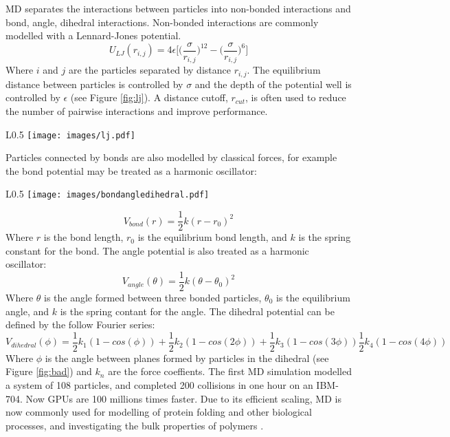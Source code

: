 MD separates the interactions between particles into non-bonded interactions and bond, angle, dihedral interactions.
Non-bonded interactions are commonly modelled with a Lennard-Jones potential.
$$ U_{LJ}(r_{i,j}) = 4\epsilon\big[\big(\frac{\sigma}{r_{i,j}}\big)^{12}-\big(\frac{\sigma}{r_{i,j}}\big)^{6}\big]$$
Where $i$ and $j$ are the particles separated by distance $r_{i,j}$.
The equilibrium distance between particles is controlled by $\sigma$ and the depth of the potential well is controlled by $\epsilon$ (see Figure \ref{fig:lj}).
A distance cutoff, $r_{cut}$, is often used to reduce the number of pairwise interactions and improve performance.

\begin{wrapfigure}{L}{0.5\linewidth}
    \centering
    \texttt{[image: images/lj.pdf]}
    \caption{The Lennard-Jones potential with relevant distances labelled}
    \label{fig:lj}
\end{wrapfigure}

Particles connected by bonds are also modelled by classical forces, for example the bond potential may be treated as a harmonic oscillator:

\begin{wrapfigure}{L}{0.5\linewidth}
    \centering
    \texttt{[image: images/bondangledihedral.pdf]}
    \caption{Bonded interactions: bond (top left), angle (top right), and dihedral (bottom). Image adapted from \cite{punma}.}
    \label{fig:bad}
\end{wrapfigure}

$$V_{bond}(r) = \frac{1}{2}k(r-r_{0})^{2}$$
Where $r$ is the bond length, $r_{0}$ is the equilibrium bond length, and $k$ is the spring constant for the bond.
The angle potential is also treated as a harmonic oscillator:
$$V_{angle}(\theta)=\frac{1}{2}k(\theta-\theta_{0})^{2}$$
Where $\theta$ is the angle formed between three bonded particles, $\theta_{0}$ is the equilibrium angle, and $k$ is the spring contant for the angle.
The dihedral potential can be defined by the follow Fourier series:
$$V_{dihedral}(\phi)=\frac{1}{2}k_{1}(1-cos(\phi))+\frac{1}{2}k_{2}(1-cos(2\phi))+\frac{1}{2}k_{3}(1-cos(3\phi))\frac{1}{2}k_{4}(1-cos(4\phi))$$
Where $\phi$ is the angle between planes formed by particles in the dihedral (see Figure \ref{fig:bad}) and $k_{n}$ are the force coeffients.
The first MD simulation modelled a system of 108 particles, and completed 200 collisions in one hour on an IBM-704\cite{Alder1957}.
Now GPUs are 100 millions times faster.
Due to its efficient scaling, MD is now commonly used for modelling of protein folding \cite{levitt75} and other biological processes, and investigating the bulk properties of polymers \cite{Gartner2019a}.

